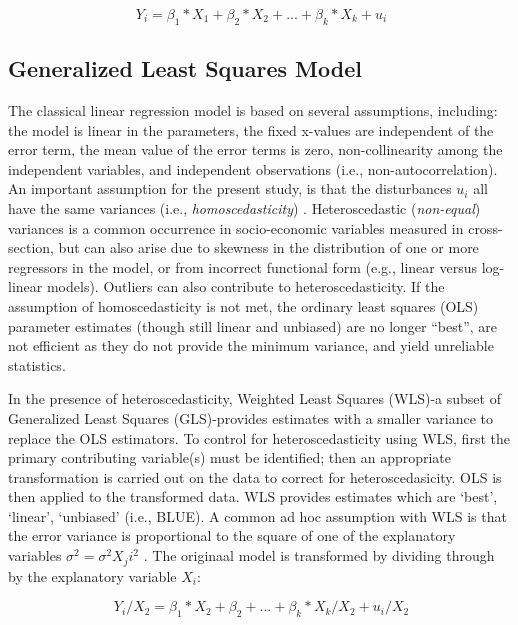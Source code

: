 \documentclass[sigconf]{acmart}
\begin{document}
\begin{equation}
  \ Y_i = \beta_1*X_1 + \beta_2*X_2 +... + \beta_k*X_k + u_i
\end{equation}

\subsection{Generalized Least Squares Model}

The classical linear regression model is based on several assumptions, 
including: the model is linear in the parameters, the fixed x-values are 
independent of the error term, the mean value of the error terms is zero, 
non-collinearity among the independent variables, and independent 
observations (i.e., non-autocorrelation). An important assumption for the 
present study, is that the disturbances $u_i$ all have the same variances 
(i.e., \emph{homoscedasticity}) . Heteroscedastic 
(\emph{non-equal}) variances is a common occurrence in socio-economic 
variables measured in cross-section, but can also arise due to skewness in 
the distribution of one or more regressors in the model, or from incorrect 
functional form (e.g., linear versus log-linear models). Outliers can also 
contribute to heteroscedasticity. If the assumption of homoscedasticity is 
not met, the ordinary least squares (OLS) parameter estimates (though still 
linear and unbiased) are no longer ``best'', are not efficient as they do 
not provide the minimum variance, and yield unreliable statistics. 

In the presence of heteroscedasticity, Weighted Least Squares (WLS)-a subset 
of Generalized Least Squares (GLS)-provides estimates with a smaller variance 
to replace the OLS estimators.  To control for heteroscedasticity using WLS, 
first the primary contributing variable(s) must be identified; then an 
appropriate transformation is carried out on the data to correct for 
heteroscedasicity. OLS is then applied to the transformed data. WLS provides 
estimates which are `best', `linear', `unbiased' (i.e., BLUE). A common 
ad hoc assumption with WLS is that the error variance is proportional to 
the square of one of the explanatory variables $\sigma^2=\sigma^2 X_ji^2$ 
\cite{gujarati09}. The originaal model is transformed by dividing through 
by the explanatory variable $X_i$:

\begin{equation}
  \ Y_i/X_2 = \beta_1*X_2 + \beta_2 +... + \beta_k*X_k/X_2 + u_i/X_2
\end{equation}
\end{document}
